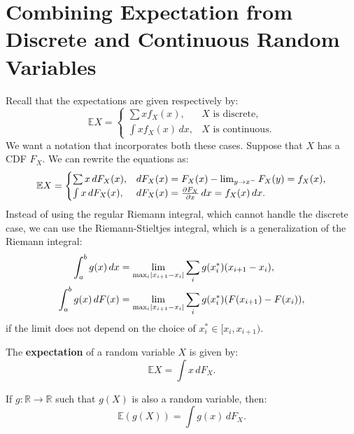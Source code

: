 \documentclass{huhtakm-template-book-v2}
\newcommand{\expect}{\mathbb{E}}
\begin{document}
\section{Combining Expectation from Discrete and Continuous Random Variables}
    Recall that the expectations are given respectively by:
    \begin{equation*}
        \expect{X} = \begin{cases}
            \sum x f_{X}(x), & X \text{ is discrete},\\
            \int x f_{X}(x)\,dx, & X \text{ is continuous}.
        \end{cases}
    \end{equation*}
    We want a notation that incorporates both these cases. Suppose that $X$ has a CDF $F_{X}$. We can rewrite the equations as:
    \begin{equation*}
        \expect{X} = \begin{cases}
            \sum x\,dF_{X}(x), & dF_{X}(x) = F_{X}(x) - \lim_{y \to x^{-}}F_{X}(y) = f_{X}(x),\\
            \int x\,dF_{X}(x), & dF_{X}(x) = \pdv{F_{X}}{x}\,dx = f_{X}(x)\,dx.
        \end{cases}
    \end{equation*}
    Instead of using the regular Riemann integral, which cannot handle the discrete case, we can use the Riemann-Stieltjes integral, which is a generalization of the Riemann integral:
    \begin{align*}
        \int_{a}^{b}g(x)\,dx &= \lim_{\max_{i}\left|{x_{i+1}-x_{i}}\right|}\sum_{i}g(x_{i}^{*})(x_{i+1}-x_{i}),\\
        \int_{a}^{b}g(x)\,dF(x) &= \lim_{\max_{i}\left|{x_{i+1}-x_{i}}\right|}\sum_{i}g(x_{i}^{*})(F(x_{i+1})-F(x_{i})),
    \end{align*}
    if the limit does not depend on the choice of $x_{i}^{*} \in [x_{i},x_{i+1})$.
    \begin{defn}
        The \textbf{expectation} of a random variable $X$ is given by:
        \begin{equation*}
            \expect{X} = \int x\,dF_{X}.
        \end{equation*}
    \end{defn}
    \begin{lem}
        If $g:\mathbb{R} \to \mathbb{R}$ such that $g(X)$ is also a random variable, then:
        \begin{equation*}
            \expect(g(X)) = \int g(x)\,dF_{X}.
        \end{equation*}
    \end{lem}
\end{document}
